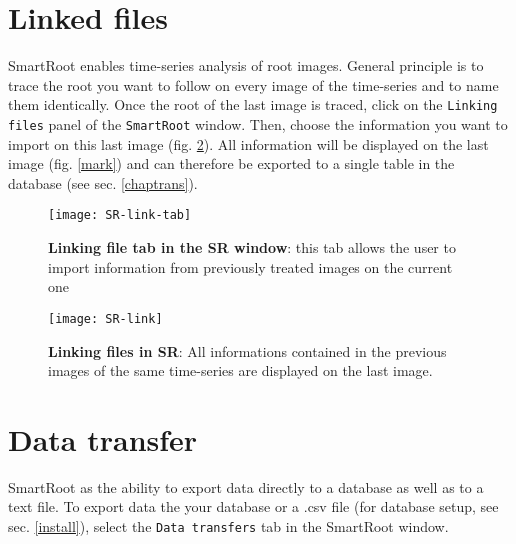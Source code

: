 \documentclass[a4paper,english,10pt]{report}
\begin{document}
\newpage

{\color{coolSection}\section{Linked files}}
\label{chaplink}

SmartRoot enables time-series analysis of root images. General principle is to trace the root you want to follow on every image of the time-series and to name them identically. Once the root of the last image is traced, click on the \verb|Linking files| panel of the \verb|SmartRoot| window. Then, choose the information you want to import on this last image (fig. \ref{SR-link}). All information will be displayed on the last image (fig. \ref{mark}) and  can therefore be exported to a single table in the database (see sec. \ref{chaptrans}).\\

 \begin{figure}[htbp]
\begin{center}
\texttt{[image: SR-link-tab]}
\caption[Linking file tab in the SR window]{\textbf{Linking file tab in the SR window}:  this tab allows the user to import information from previously treated images on the current one}
\label{SR-link}
\end{center}
\end{figure}

 \begin{figure}[htbp]
\begin{center}
\texttt{[image: SR-link]}
\caption[Linking files in SR]{\textbf{Linking files in SR}:  All informations contained in the previous images of the same time-series are displayed on the last image.}
\label{SR-link}
\end{center}
\end{figure}



\newpage
{\color{coolSection}\section{Data transfer}}
\label{chaptrans}

SmartRoot as the ability to export data directly to a database as well as to a text file. To export data the your database or a .csv file (for database setup, see sec. \ref{install}), select the \verb|Data transfers| tab in the SmartRoot window. \\
\end{document}
